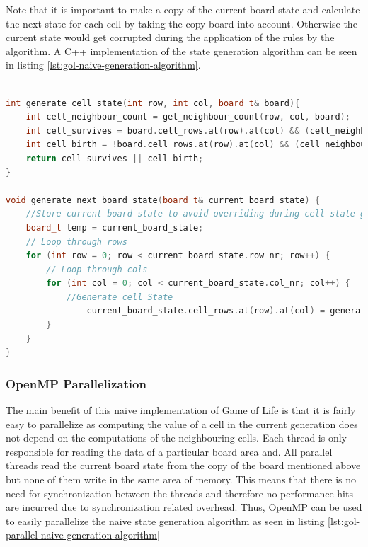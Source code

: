 \documentclass[a4paper,english,12pt,twoside=false]{scrartcl} %
\begin{document}
Note that it is important to make a copy of the current board state and calculate the next state for each cell by taking the copy board into account. Otherwise the current state would get corrupted during the application of the rules by the algorithm. A C++ implementation of the state generation algorithm can be seen in listing \ref{lst:gol-naive-generation-algorithm}.

\begin{lstlisting}[caption={Naive State Generation Algorithm},label={lst:gol-naive-generation-algorithm},language=C++]

int generate_cell_state(int row, int col, board_t& board){
    int cell_neighbour_count = get_neighbour_count(row, col, board);
    int cell_survives = board.cell_rows.at(row).at(col) && (cell_neighbour_count == 2 || cell_neighbour_count == 3);
    int cell_birth = !board.cell_rows.at(row).at(col) && (cell_neighbour_count == 3);
    return cell_survives || cell_birth;
}

void generate_next_board_state(board_t& current_board_state) {
    //Store current board state to avoid overriding during cell state generation
    board_t temp = current_board_state;
    // Loop through rows
    for (int row = 0; row < current_board_state.row_nr; row++) {
        // Loop through cols
        for (int col = 0; col < current_board_state.col_nr; col++) {
        	//Generate cell State
        		current_board_state.cell_rows.at(row).at(col) = generate_cell_state(row, col, temp);
        }
    }
}
\end{lstlisting}

\subsubsection{OpenMP Parallelization}

The main benefit of this naive implementation of Game of Life is that it is fairly easy to parallelize as computing the value of a cell in the current generation does not depend on the computations of the neighbouring cells. Each thread is only responsible for reading the data of a particular board area and. All parallel threads read the current board state from the copy of the board mentioned above but none of them write in the same area of memory. This means that there is no need for synchronization between the threads and therefore no performance hits are incurred due to synchronization related overhead. Thus, OpenMP can be used to easily parallelize the naive state generation algorithm as seen in listing \ref{lst:gol-parallel-naive-generation-algorithm} \breakln
\end{document}
